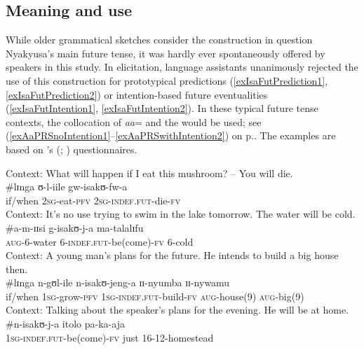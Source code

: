 \subsection{Meaning and use}
While older grammatical sketches consider the construction in question Nyakyusa's main future tense, it was hardly ever spontaneously offered by speakers in this study. In elicitation, language assistants unanimously rejected the use of this construction for prototypical predictions (\ref{exIsaFutPrediction1}, \ref{exIsaFutPrediction2}) or intention-based future eventualities (\ref{exIsaFutIntention1}, \ref{exIsaFutIntention2}). In these typical future tense contexts, the collocation of \textit{aa}= and the  would be used; see (\ref{exAaPRSnoIntention1}--\ref{exAaPRSwithIntention2}) on p.\nobreakspace\pageref{exAaPRSnoIntention1}. The examples are based on \citeauthor{DahlOe1985}'s (\citeyear{DahlOe1985}; \citeyear{DahlOe2000b}) questionnaires.
\begin{exe}
\ex \label{exIsaFutPrediction1}
Context: What will happen if I eat this mushroom? -- You will die.\\
\gll \#lɪnga ʊ-l-iile gw-isakʊ-fw-a\\
\phantom{\#}if/when \textsc{2sg}-eat-\textsc{pfv} \textsc{2sg}-\textsc{indef.fut}-die-\textsc{fv}\\

\ex \label{exIsaFutPrediction2}
Context: It's no use trying to swim in the lake tomorrow. The water will be cold.\\
\gll \#a-m-ɪɪsi g-isakʊ-j-a ma-talalɪfu\\
\phantom{\#}\textsc{aug}-6-water 6-\textsc{indef.fut}-be(come)-\textsc{fv} 6-cold\\
\ex \label{exIsaFutIntention1}
Context: A young man's plans for the future. He intends to build a big house then.\\
\gll \#lɪnga n-gʊl-ile n-isakʊ-jeng-a ɪɪ-nyumba ɪɪ-nywamu\\
\phantom{\#}if/when \textsc{1sg}-grow-\textsc{pfv} \textsc{1sg}-\textsc{indef.fut}-build-\textsc{fv} \textsc{aug}-house(9) \textsc{aug}-big(9)\\
\ex \label{exIsaFutIntention2}
Context: Talking about the speaker's plans for the evening. He will be at home.\\
\gll \#n-isakʊ-j-a itolo pa-ka-aja\\
\phantom{\#}\textsc{1sg}-\textsc{indef.fut}-be(come)-\textsc{fv} just 16-12-homestead\\
\end{exe}


